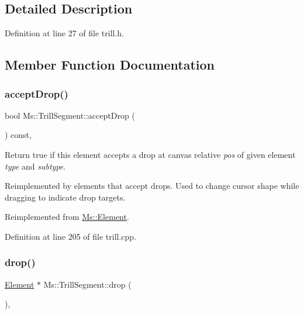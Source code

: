 \subsection{Detailed Description}


Definition at line 27 of file trill.\+h.



\subsection{Member Function Documentation}
\mbox{\label{class_ms_1_1_trill_segment_aec0e095f72a35b9287721214ffb68b9f}} 
\subsubsection{\texorpdfstring{accept\+Drop()}{acceptDrop()}}
{\footnotesize\ttfamily bool Ms\+::\+Trill\+Segment\+::accept\+Drop (\begin{DoxyParamCaption}\item[{\hyperlink{class_ms_1_1_edit_data}{Edit\+Data} \&}]{ }\end{DoxyParamCaption}) const\hspace{0.3cm}{\ttfamily [override]}, {\ttfamily [virtual]}}

Return true if this element accepts a drop at canvas relative {\itshape pos} of given element {\itshape type} and {\itshape subtype}.

Reimplemented by elements that accept drops. Used to change cursor shape while dragging to indicate drop targets. 

Reimplemented from \hyperlink{class_ms_1_1_element_a35614445f0bc2212cbcc75c3f5810543}{Ms\+::\+Element}.



Definition at line 205 of file trill.\+cpp.

\mbox{\label{class_ms_1_1_trill_segment_a743f071ab284f933eefa50dac98b7dde}} 
\subsubsection{\texorpdfstring{drop()}{drop()}}
{\footnotesize\ttfamily \hyperlink{class_ms_1_1_element}{Element} $\ast$ Ms\+::\+Trill\+Segment\+::drop (\begin{DoxyParamCaption}\item[{\hyperlink{class_ms_1_1_edit_data}{Edit\+Data} \&}]{ }\end{DoxyParamCaption})\hspace{0.3cm}{\ttfamily [override]}, {\ttfamily [virtual]}}

